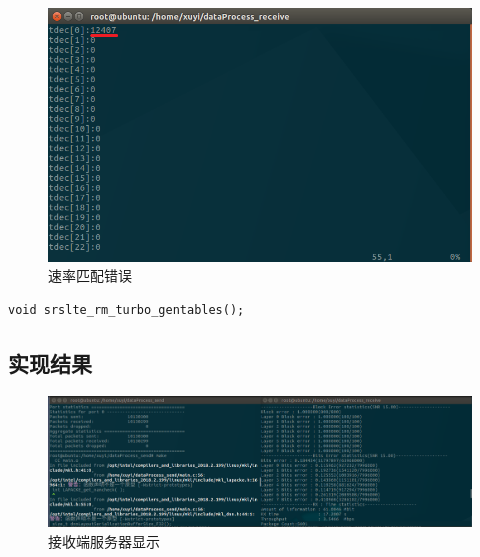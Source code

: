 \documentclass{article}
\begin{document}
\begin{figure}[H]
	\centering
	\includegraphics[width = .8\textwidth]{tdec_error.png}
	\caption{速率匹配错误}
\end{figure}
\begin{lstlisting}
void srslte_rm_turbo_gentables();
\end{lstlisting}
\subsection{实现结果}
\begin{figure}[H]
	\centering
	\includegraphics[width = \textwidth]{result1.png}
	\caption{接收端服务器显示}
\end{figure}

\end{document}
